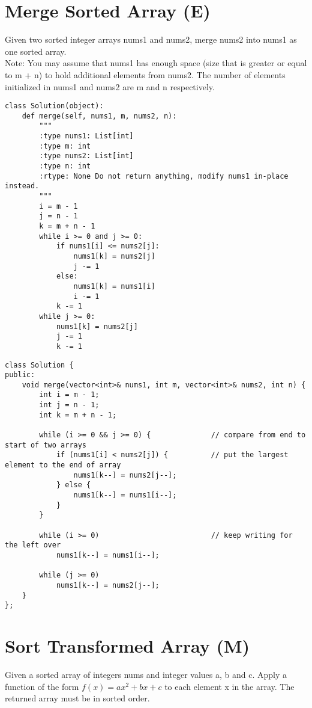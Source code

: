 \section{Merge Sorted Array (E)}
Given two sorted integer arrays nums1 and nums2, merge nums2 into nums1 as one sorted array.\\

Note: You may assume that nums1 has enough space (size that is greater or equal to m + n) to hold additional elements from nums2. The number of elements initialized in nums1 and nums2 are m and n respectively.\\

\begin{lstlisting}
class Solution(object):
    def merge(self, nums1, m, nums2, n):
        """
        :type nums1: List[int]
        :type m: int
        :type nums2: List[int]
        :type n: int
        :rtype: None Do not return anything, modify nums1 in-place instead.
        """
        i = m - 1
        j = n - 1
        k = m + n - 1
        while i >= 0 and j >= 0:
            if nums1[i] <= nums2[j]:
                nums1[k] = nums2[j]
                j -= 1
            else:
                nums1[k] = nums1[i]
                i -= 1
            k -= 1
        while j >= 0:
            nums1[k] = nums2[j]
            j -= 1
            k -= 1
\end{lstlisting}

\begin{lstlisting}
class Solution {
public:
    void merge(vector<int>& nums1, int m, vector<int>& nums2, int n) {
        int i = m - 1;
        int j = n - 1;
        int k = m + n - 1;
        
        while (i >= 0 && j >= 0) {              // compare from end to start of two arrays
            if (nums1[i] < nums2[j]) {          // put the largest element to the end of array
                nums1[k--] = nums2[j--];
            } else {
                nums1[k--] = nums1[i--];
            }
        }
        
        while (i >= 0)                          // keep writing for the left over
            nums1[k--] = nums1[i--];
            
        while (j >= 0)
            nums1[k--] = nums2[j--];
    }
};
\end{lstlisting}


\section{Sort Transformed Array (M)}
Given a sorted array of integers nums and integer values a, b and c. Apply a function of the form $f(x) = ax^2 + bx + c$ to each element x in the array. The returned array must be in sorted order.\\

